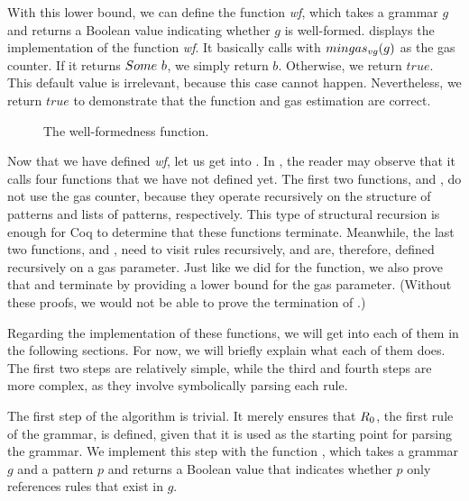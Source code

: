 With this lower bound,
we can define the function \textit{wf},
which takes a grammar $g$ and returns a Boolean value
indicating whether $g$ is well-formed.
 displays the implementation
of the function \textit{wf}.
It basically calls \textit{\verifygrammarname{}}
with $mingas_{vg}(g)$ as the gas counter.
If it returns $Some\ b$, we simply return $b$.
Otherwise, we return $true$.
This default value is irrelevant,
because this case cannot happen.
Nevertheless, we return $true$
to demonstrate that the function
and gas estimation are correct.

\begin{figure}
    \centering
    
    \caption{The well-formedness function.}
    \label{fig:wf}
\end{figure}

Now that we have defined \textit{wf},
let us get into \textit{\verifygrammarname{}}.
In ,
the reader may observe that
it calls four functions that we have not defined yet.
The first two functions,
\textit{\coherentname{}} and \textit{\lcoherentname{}},
do not use the gas counter,
because they operate recursively on the structure of patterns
and lists of patterns, respectively.
This type of structural recursion is enough for Coq
to determine that these functions terminate.
Meanwhile, the last two functions,
\textit{\lverifyrulename{}} and \textit{\lcheckloopsname{}},
need to visit rules recursively,
and are, therefore, defined recursively on a gas parameter.
Just like we did for
the \textit{\verifygrammarname{}} function,
we also prove that \textit{\lverifyrulename{}} and \textit{\lcheckloopsname{}}
terminate by providing a lower bound for the gas parameter.
(Without these proofs,
we would not be able to prove the termination
of \textit{\verifygrammarname{}}.)

Regarding the implementation of these functions,
we will get into each of them in the following sections.
For now, we will briefly explain what each of them does.
The first two steps are relatively simple,
while the third and fourth steps are more complex,
as they involve symbolically parsing each rule.

The first step of the algorithm is trivial.
It merely ensures that $R_{0}$,
the first rule of the grammar,
is defined,
given that it is used as the starting point
for parsing the grammar.
We implement this step with the function
\textit{\coherentname{}},
which takes a grammar $g$ and a pattern $p$
and returns a Boolean value
that indicates whether $p$ only references rules
that exist in $g$.

